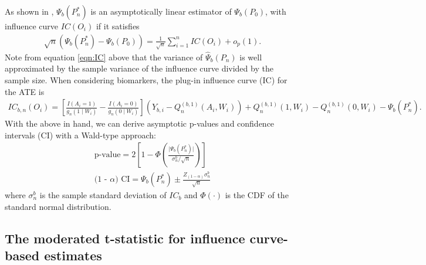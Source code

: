 As shown in \cite{van2011targeted}, $\Psi_b(P^*_n)$ is an asymptotically
linear estimator of $\Psi_b(P_0)$, with influence curve $IC(O_i)$ if it
satisfies
\begin{eqnarray}
\sqrt{n}(\Psi_b(P^*_n) - \Psi_b(P_0)) = \frac{1}{\sqrt{n}}\sum^{n}_{i = 1}IC(O_i)
+ o_p(1).
\label{eqn:IC}
\end{eqnarray}
Note from equation \ref{eqn:IC} above that the variance of $\hat{\Psi}_b(P_n)$
is well approximated by the sample variance of the influence curve divided by
the sample size. When considering biomarkers, the plug-in influence curve (IC)
for the ATE is
\begin{eqnarray*}
IC_{b, n}(O_i) = \left[ \frac{I(A_i = 1)}{g_n(1 \mid W_i)} - \frac{I(A_i =
0)}{g_n(0 \mid W_i)} \right] (Y_{b, i} - Q^{(b, 1)}_{n}(A_i, W_i)) +
Q^{(b, 1)}_{n}(1, W_i) - Q^{(b,1)}_{n}(0, W_i) - \Psi_b(P^*_n).
\end{eqnarray*}
With the above in hand, we can derive asymptotic p-values and confidence
intervals (CI) with a Wald-type approach:
\begin{eqnarray}
\mbox{p-value} = 2 \left[ 1 -
  \Phi(\frac{\vert\Psi_b(P^*_n)\vert}{\sigma^b_n/\sqrt{n}}) \right] \\
\mbox{(1 - $\alpha$) CI} = \Psi_b(P^*_n) \pm
  \frac{Z_{(1 - \alpha)} \sigma^b_{n}}{\sqrt{n}}
\label{eqn:tmleInference}
\end{eqnarray}
where $\sigma^b_{n}$ is the sample standard deviation of $IC_b$ and
$\Phi(\cdot)$ is the CDF of the standard normal distribution.

\subsection{The moderated t-statistic for influence curve-based
estimates}\label{modtIC}

